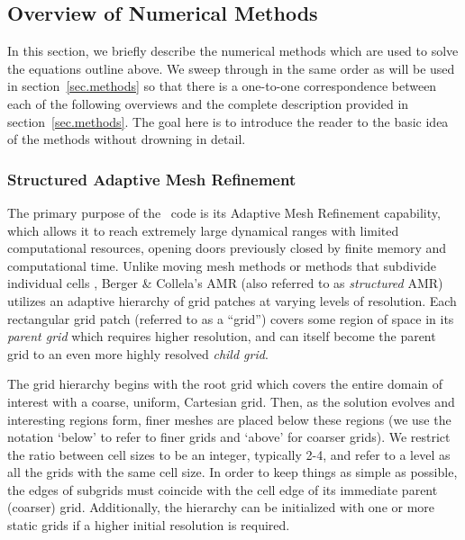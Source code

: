 


\subsection{Overview of Numerical Methods}

In this section, we briefly describe the numerical methods which are used to solve the equations outline above.  We sweep through in the same order as will be used in section~\ref{sec.methods} so that there is a one-to-one correspondence between each of the following overviews and the complete description provided in section~\ref{sec.methods}.  The goal here is to introduce the reader to the basic idea of the methods without drowning in detail.

\subsubsection{Structured Adaptive Mesh Refinement}

The primary purpose of the \enzo\ code is its Adaptive Mesh Refinement
capability, which allows it to reach extremely large dynamical ranges
with limited computational resources, opening doors previously closed
by finite memory and computational time. Unlike moving mesh methods
\citep{1995ApJS..100..269P,1995ApJS...97..231G} or  
methods that subdivide 
individual cells \citep{Adjerid}, Berger \& Collela's AMR (also referred 
to as \emph{structured} AMR) utilizes an adaptive hierarchy of grid 
patches at varying levels of resolution.  Each rectangular grid patch 
(referred to as a ``grid'') covers some region of space in its 
\emph{parent grid} which requires higher resolution, and can itself 
become the parent grid to an even more highly resolved \emph{child grid}. 

The grid hierarchy begins with the root grid which covers the entire
domain of interest with a coarse, uniform, Cartesian grid. Then, as
the solution evolves and interesting regions form, finer meshes are
placed below these regions (we use the notation `below' to refer to
finer grids and `above' for coarser grids).  We restrict the ratio
between cell sizes to be an integer, typically 2-4, and refer to a
level as all the grids with the same cell size.  In order to keep
things as simple as possible, the edges of subgrids must coincide with
the cell edge of its immediate parent (coarser) grid. Additionally,
the hierarchy can be initialized with one or more static grids if a
higher initial resolution is required.


